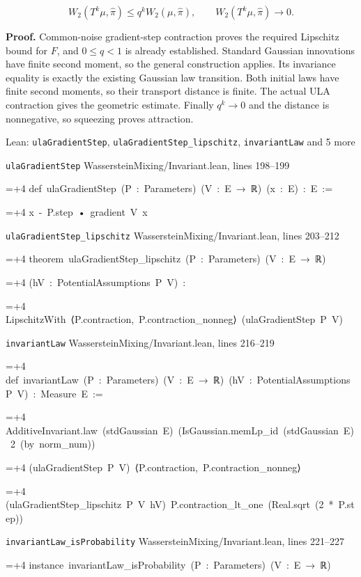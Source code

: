 \documentclass[11pt,a4paper]{article}
\newlength{\leancharwidth}
\newenvironment{leancode}{\par\smallskip\begingroup\ttfamily\footnotesize\raggedright
  \settowidth{\leancharwidth}{M}\setlength{\parskip}{0pt}\setlength{\parindent}{0pt}
  \frenchspacing}{\par\endgroup\smallskip}
\newcommand{\leanline}[2]{\hangindent=\dimexpr#1\leancharwidth+4\leancharwidth\relax
  \hangafter=1\noindent\hspace*{#1\leancharwidth}#2\par}
\newcommand{\leansource}[1]{\par{\footnotesize\color{leanmuted}#1}\par}
\begin{document}
\[W_2(T^k\mu,\widehat\pi)\le q^kW_2(\mu,\widehat\pi),
\qquad W_2(T^k\mu,\widehat\pi)\longrightarrow0.\]


\textbf{Proof.} Common-noise gradient-step contraction proves the required Lipschitz bound for \(F\), and \(0\le q<1\) is already established. Standard Gaussian innovations have finite second moment, so the general construction applies. Its invariance equality is exactly the existing Gaussian law transition. Both initial laws have finite second moments, so their transport distance is finite. The actual ULA contraction gives the geometric estimate. Finally \(q^k\to0\) and the distance is nonnegative, so squeezing proves attraction.

\begin{leanbox}{Lean: \texttt{ulaGradientStep}, \texttt{ulaGradientStep\_\allowbreak{}lipschitz}, \texttt{invariantLaw} and 5 more}
\leansource{\texttt{ulaGradientStep} \quad WassersteinMixing/\allowbreak{}Invariant.lean, lines 198–199}
\begin{leancode}
\leanline{0}{def\ ulaGradientStep\ (P\ :\ Parameters)\ (V\ :\ E\ →\ ℝ)\ (x\ :\ E)\ :\ E\ :=}
\leanline{2}{x\ -\ P.step\ •\ gradient\ V\ x}
\end{leancode}
\leansource{\texttt{ulaGradientStep\_\allowbreak{}lipschitz} \quad WassersteinMixing/\allowbreak{}Invariant.lean, lines 203–212}
\begin{leancode}
\leanline{0}{theorem\ ulaGradientStep\_lipschitz\ (P\ :\ Parameters)\ (V\ :\ E\ →\ ℝ)}
\leanline{4}{(hV\ :\ PotentialAssumptions\ P\ V)\ :}
\leanline{4}{LipschitzWith\ ⟨P.contraction,\ P.contraction\_nonneg⟩\ (ulaGradientStep\ P\ V)}
\end{leancode}
\leansource{\texttt{invariantLaw} \quad WassersteinMixing/\allowbreak{}Invariant.lean, lines 216–219}
\begin{leancode}
\leanline{0}{def\ invariantLaw\ (P\ :\ Parameters)\ (V\ :\ E\ →\ ℝ)\ (hV\ :\ PotentialAssumptions\ P\ V)\ :\ Measure\ E\ :=}
\leanline{2}{AdditiveInvariant.law\ (stdGaussian\ E)\ (IsGaussian.memLp\_id\ (stdGaussian\ E)\ 2\ (by\ norm\_num))}
\leanline{4}{(ulaGradientStep\ P\ V)\ ⟨P.contraction,\ P.contraction\_nonneg⟩}
\leanline{4}{(ulaGradientStep\_lipschitz\ P\ V\ hV)\ P.contraction\_lt\_one\ (Real.sqrt\ (2\ *\ P.step))}
\end{leancode}
\leansource{\texttt{invariantLaw\_\allowbreak{}isProbability} \quad WassersteinMixing/\allowbreak{}Invariant.lean, lines 221–227}
\begin{leancode}
\leanline{0}{instance\ invariantLaw\_isProbability\ (P\ :\ Parameters)\ (V\ :\ E\ →\ ℝ)}

\end{leancode}
\end{leanbox}
\end{document}
